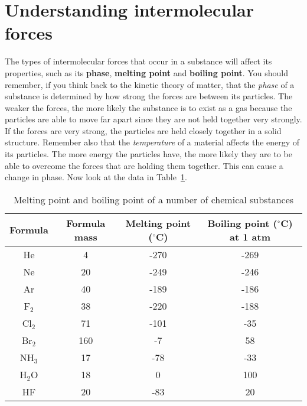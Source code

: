 \section{Understanding intermolecular forces}
\label{sec:intermolecular:understanding}

The types of intermolecular forces that occur in a substance will affect its properties, such as its \textbf{phase}, \textbf{melting point} and \textbf{boiling point}. You should remember, if you think back to the kinetic theory of matter, that the \textit{phase} of a substance is determined by how strong the forces are between its particles. The weaker the forces, the more likely the substance is to exist as a gas because the particles are able to move far apart since they are not held together very strongly. If the forces are very strong, the particles are held closely together in a solid structure. Remember also that the \textit{temperature} of a material affects the energy of its particles. The more energy the particles have, the more likely they are to be able to overcome the forces that are holding them together. This can cause a change in phase.
\vspace{-.5cm}
Now look at the data in Table~\ref{tab:intermolecular:mpbp}.

\begin{table}[h]
\begin{center}
\begin{tabular}{|c|c|c|c|}\hline
\textbf{Formula} & \textbf{Formula mass} & \textbf{Melting point} ($^{\circ}$C) & \textbf{Boiling point} ($^{\circ}$C) at 1 atm \\\hline
He & 4 & -270 & -269 \\\hline
Ne & 20 & -249 & -246 \\\hline
Ar & 40 & -189 & -186 \\\hline
F$_{2}$ & 38 & -220 & -188 \\\hline
Cl$_{2}$ & 71 & -101 & -35 \\\hline
Br$_{2}$ & 160 & -7 & 58 \\\hline
NH$_{3}$ & 17 & -78 & -33 \\\hline
H$_{2}$O & 18 & 0 & 100 \\\hline
HF & 20 & -83 & 20 \\\hline
\end{tabular}
\caption{Melting point and boiling point of a number of chemical substances}
\label{tab:intermolecular:mpbp}
\end{center}
\end{table}

